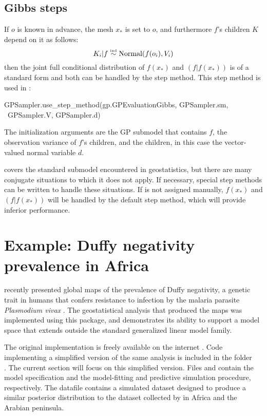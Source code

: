 \documentclass[article]{jss}
\begin{document}
\subsection{Gibbs steps} 
\label{sec:gp-gibbs} 
If $o$ is known in advance, the mesh $x_*$ is set to $o$, and furthermore $f$'s children $K$ depend on it as follows:
\begin{equation}
    \label{eq:gibbs-criterion} 
    K_i|f \stackrel{\textup{\tiny ind}}{\sim} \textup{Normal}(f(o_i),V_i)
\end{equation}
then the joint full conditional distribution of $f(x_*)$ and $(f|f(x_*))$ is of a standard form and both can be handled by the  step method. This step method is used in :
\begin{CodeChunk}
\begin{CodeInput}
GPSampler.use_step_method(gp.GPEvaluationGibbs, GPSampler.sm, \
    GPSampler.V, GPSampler.d)
\end{CodeInput}
\end{CodeChunk}
The initialization arguments are the GP submodel that contains $f$, the observation variance of $f$'s children, and the children, in this case the vector-valued normal variable $d$. 

 covers the standard submodel encountered in geostatistics, but there are many conjugate situations to which it does not apply. If necessary, special step methods can be written to handle these situations. If  is not assigned manually, $f(x_*)$ and $(f|f(x_*))$ will be handled by the default  step method, which will provide inferior performance. 


\section{Example: Duffy negativity prevalence in Africa}
\label{sec:duffy} 

\cite{Howes} recently presented global maps of the prevalence of Duffy negativity, a genetic trait in humans that confers resistance to infection by the malaria parasite \emph{Plasmodium vivax} \citep{duffy-vivax}. The geostatistical analysis that produced the maps was implemented using this package, and demonstrates its ability to support a model space that extends outside the standard generalized linear model family. 

The original implementation is freely available on the internet \citep{duffy-code, generic-mbg}. Code implementing a simplified version of the same analysis is included in the folder \\. The current section will focus on this simplified version. Files  and  contain the model specification and the model-fitting and predictive simulation procedure, respectively. The datafile  contains a simulated dataset designed to produce a similar posterior distribution to the dataset collected by \cite{Howes} in Africa and the Arabian peninsula. 
\end{document}
